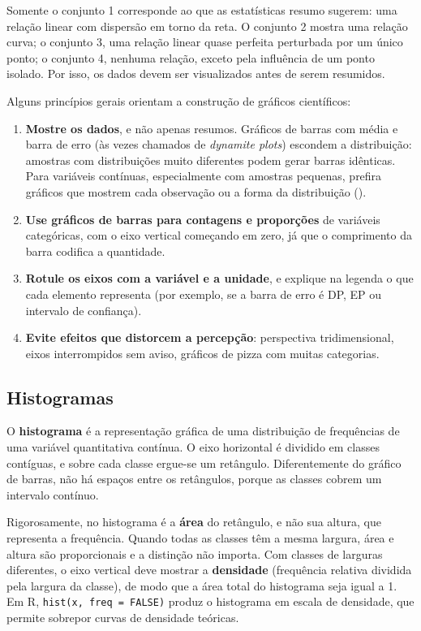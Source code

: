 \documentclass[
]{book}
\providecommand{\tightlist}{%
  \setlength{\itemsep}{0pt}\setlength{\parskip}{0pt}}
\begin{document}
Somente o conjunto 1 corresponde ao que as estatísticas resumo sugerem: uma relação linear com dispersão em torno da reta. O conjunto 2 mostra uma relação curva; o conjunto 3, uma relação linear quase perfeita perturbada por um único ponto; o conjunto 4, nenhuma relação, exceto pela influência de um ponto isolado. Por isso, os dados devem ser visualizados antes de serem resumidos.

Alguns princípios gerais orientam a construção de gráficos científicos:

\begin{enumerate}
\def\labelenumi{\arabic{enumi}.}
\tightlist
\item
  \textbf{Mostre os dados}, e não apenas resumos. Gráficos de barras com média e barra de erro (às vezes chamados de \emph{dynamite plots}) escondem a distribuição: amostras com distribuições muito diferentes podem gerar barras idênticas. Para variáveis contínuas, especialmente com amostras pequenas, prefira gráficos que mostrem cada observação ou a forma da distribuição ().
\item
  \textbf{Use gráficos de barras para contagens e proporções} de variáveis categóricas, com o eixo vertical começando em zero, já que o comprimento da barra codifica a quantidade.
\item
  \textbf{Rotule os eixos com a variável e a unidade}, e explique na legenda o que cada elemento representa (por exemplo, se a barra de erro é DP, EP ou intervalo de confiança).
\item
  \textbf{Evite efeitos que distorcem a percepção}: perspectiva tridimensional, eixos interrompidos sem aviso, gráficos de pizza com muitas categorias.
\end{enumerate}

\subsection{Histogramas}\label{histogramas}

O \textbf{histograma} é a representação gráfica de uma distribuição de frequências de uma variável quantitativa contínua. O eixo horizontal é dividido em classes contíguas, e sobre cada classe ergue-se um retângulo. Diferentemente do gráfico de barras, não há espaços entre os retângulos, porque as classes cobrem um intervalo contínuo.

Rigorosamente, no histograma é a \textbf{área} do retângulo, e não sua altura, que representa a frequência. Quando todas as classes têm a mesma largura, área e altura são proporcionais e a distinção não importa. Com classes de larguras diferentes, o eixo vertical deve mostrar a \textbf{densidade} (frequência relativa dividida pela largura da classe), de modo que a área total do histograma seja igual a 1. Em R, \texttt{hist(x,\ freq\ =\ FALSE)} produz o histograma em escala de densidade, que permite sobrepor curvas de densidade teóricas.
\end{document}
